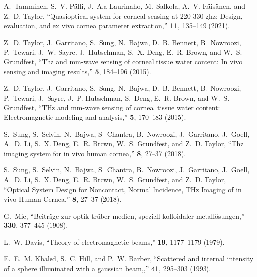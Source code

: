 \documentclass{osa-article}
\begin{document}
\begin{thebibliography}{10}
\newcommand{\enquote}[1]{``#1''}

A.~Tamminen, S.~V. Pälli, J.~Ala-Laurinaho, M.~Salkola, A.~V. Räisänen, and
  Z.~D. Taylor, \enquote{Quasioptical system for corneal sensing at 220-330
  ghz: Design, evaluation, and ex vivo cornea parameter extraction,}
  {\protect{}} \textbf{11},
  135--149 (2021).

Z.~D. {Taylor}, J.~{Garritano}, S.~{Sung}, N.~{Bajwa}, D.~B. {Bennett},
  B.~{Nowroozi}, P.~{Tewari}, J.~W. {Sayre}, J.~{Hubschman}, S.~X. {Deng},
  E.~R. {Brown}, and W.~S. {Grundfest}, \enquote{Thz and mm-wave sensing of
  corneal tissue water content: In vivo sensing and imaging results,}
  {\protect{}} \textbf{5},
  184--196 (2015).

Z.~D. Taylor, J.~Garritano, S.~Sung, N.~Bajwa, D.~B. Bennett, B.~Nowroozi,
  P.~Tewari, J.~Sayre, J.~P. Hubschman, S.~Deng, E.~R. Brown, and W.~S.
  Grundfest, \enquote{{THz and mm-wave sensing of corneal tissue water content:
  Electromagnetic modeling and analysis},} {\protect{}} \textbf{5}, 170--183 (2015).

S.~Sung, S.~Selvin, N.~Bajwa, S.~Chantra, B.~Nowroozi, J.~Garritano, J.~Goell,
  A.~D. Li, S.~X. Deng, E.~R. Brown, W.~S. Grundfest, and Z.~D. Taylor,
  \enquote{Thz imaging system for in vivo human cornea,}
  {\protect{}} \textbf{8},
  27--37 (2018).

S.~Sung, S.~Selvin, N.~Bajwa, S.~Chantra, B.~Nowroozi, J.~Garritano, J.~Goell,
  A.~D. Li, S.~X. Deng, E.~R. Brown, W.~S. Grundfest, and Z.~D. Taylor,
  \enquote{{Optical System Design for Noncontact, Normal Incidence, THz Imaging
  of in vivo Human Cornea},} {\protect{}} \textbf{8}, 27--37 (2018).

G.~Mie, \enquote{Beiträge zur optik trüber medien, speziell kolloidaler
  metallösungen,} {\protect{}} \textbf{330},
  377--445 (1908).

L.~W. Davis, \enquote{Theory of electromagnetic beams,}
  {\protect{}} \textbf{19}, 1177--1179 (1979).

E.~E.~M. {Khaled}, S.~C. {Hill}, and P.~W. {Barber}, \enquote{Scattered and
  internal intensity of a sphere illuminated with a gaussian beam,,}
  {\protect{}} \textbf{41},
  295--303 (1993).


\end{thebibliography}
\end{document}
